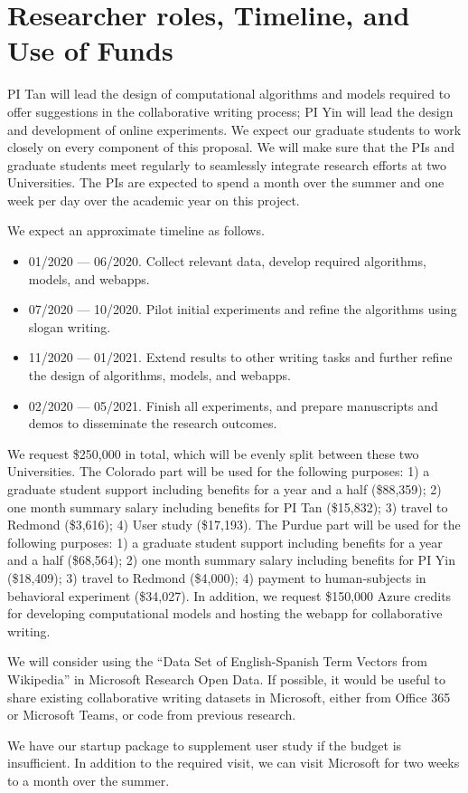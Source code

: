 
\section{Researcher roles, Timeline, and Use of Funds}

PI Tan will lead the design of computational algorithms and models required to offer suggestions in the collaborative writing process;
PI Yin will lead the design and development of online experiments.
We expect our graduate students to work closely on every component of this proposal.
We will make sure that the PIs and graduate students meet regularly to seamlessly integrate research efforts at two Universities.
The PIs are expected to spend a month over the summer and one week per day over the academic year on this project.


 We expect an approximate timeline as follows.

\begin{itemize}[leftmargin=*,noitemsep,topsep=0pt,parsep=0pt,partopsep=0pt]
    \item 01/2020 --- 06/2020. Collect relevant data, develop required algorithms, models, and webapps.
    \item 07/2020 --- 10/2020. Pilot initial experiments and refine the algorithms using slogan writing.
    \item 11/2020 --- 01/2021. Extend results to other writing tasks and further refine the design of algorithms, models, and webapps.
    \item 02/2020 --- 05/2021. Finish all experiments, and prepare manuscripts and demos to disseminate the research outcomes.
\end{itemize}

 We request \$250,000 in total, which will be evenly split between these two Universities.
The Colorado part will be used for the following purposes:
1) a graduate student support including benefits for a year and a half (\$88,359);
2) one month summary salary including benefits for PI Tan (\$15,832);
3) travel to Redmond (\$3,616);
4) User study (\$17,193).
The Purdue part will be used for the following purposes:
1) a graduate student support including benefits for a year and a half (\$68,564);
2) one month summary salary including benefits for PI Yin (\$18,409);
3) travel to Redmond (\$4,000);
4) payment to human-subjects in behavioral experiment (\$34,027).
In addition, we request \$150,000 Azure credits for developing computational models and hosting the webapp for collaborative writing.


 We will consider using the ``Data Set of English-Spanish Term Vectors from Wikipedia'' in Microsoft Research Open Data. 
If possible, it would be useful to share existing collaborative writing datasets in Microsoft, either from Office 365 or Microsoft Teams, or code from previous research.

We have our startup package to supplement user study if the budget is insufficient.
In addition to the required visit, we can visit Microsoft for two weeks to a month over the summer.

